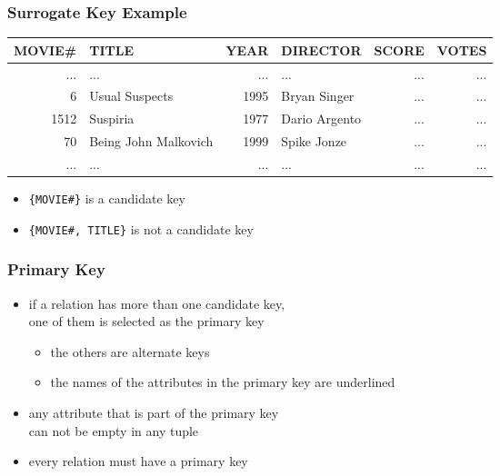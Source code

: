 \documentclass[dvipsnames]{beamer}
\theoremstyle{plain}
\begin{document}
\begin{frame}
  \frametitle{Surrogate Key Example}

    \begin{footnotesize}
    \begin{table}
      \begin{tabular}{|r|l|r|l|r|r|}\hline
MOVIE\# & TITLE                & YEAR & DIRECTOR      & SCORE & VOTES\\\hline\hline
    ... & ...                  &  ... & ...           &   ... &   ...\\\hline
      6 & Usual Suspects       & 1995 & Bryan Singer  &   ... &   ...\\\hline
   1512 & Suspiria             & 1977 & Dario Argento &   ... &   ...\\\hline
     70 & Being John Malkovich & 1999 & Spike Jonze   &   ... &   ...\\\hline
    ... & ...                  &  ... & ...           &   ... &   ...\\\hline
      \end{tabular}
    \end{table}
    \end{footnotesize}

    \begin{itemize}
      \item \texttt{\{MOVIE\#\}} is a candidate key
      \item \texttt{\{MOVIE\#, TITLE\}} is not a candidate key
    \end{itemize}
\end{frame}

\begin{frame}
  \frametitle{Primary Key}

  \begin{itemize}
    \item if a relation has more than one candidate key,\\
      one of them is selected as the \alert{primary key}
    \begin{itemize}
      \item the others are alternate keys
      \item the names of the attributes in the primary key are underlined
    \end{itemize}

    \pause
    \medskip
    \item any attribute that is part of the primary key\\
      can not be empty in any tuple

    \medskip
    \item every relation must have a primary key
  \end{itemize}
\end{frame}
\end{document}
